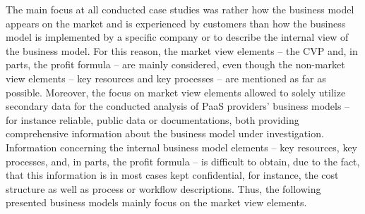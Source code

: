 The main focus at all conducted case studies was rather how the business model appears on the market and is experienced by customers than how the business model is implemented by a specific company or to describe the internal view of the business model. For this reason, the market view elements -- the \ac{CVP} and, in parts, the profit formula -- are mainly considered, even though the non-market view elements -- key resources and key processes -- are mentioned as far as possible. Moreover, the focus on market view elements allowed to solely utilize secondary data for the conducted analysis of \ac{PaaS} providers' business models -- for instance reliable, public data or documentations, both providing comprehensive information about the business model under investigation. Information concerning the internal business model elements -- key resources, key processes, and, in parts, the profit formula -- is difficult to obtain, due to the fact, that this information is in most cases kept confidential, for instance, the cost structure as well as process or workflow descriptions. Thus, the following presented business models mainly focus on the market view elements.